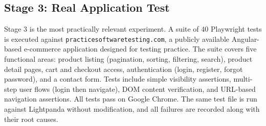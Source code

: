 \subsection{Stage 3: Real Application Test}

Stage 3 is the most practically relevant experiment. A suite of 40 Playwright tests is executed against \texttt{practicesoftwaretesting.com}, a publicly available Angular-based e-commerce application designed for testing practice. The suite covers five functional areas: product listing (pagination, sorting, filtering, search), product detail pages, cart and checkout access, authentication (login, register, forgot password), and a contact form. Tests include simple visibility assertions, multi-step user flows (login then navigate), DOM content verification, and URL-based navigation assertions. All tests pass on Google Chrome. The same test file is run against Lightpanda without modification, and all failures are recorded along with their root causes.
